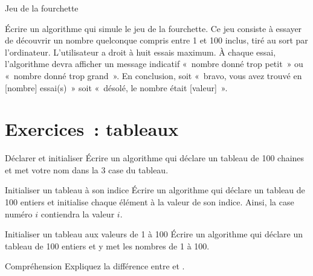 	\begin{Exercice}{Jeu de la fourchette}

		Écrire un algorithme qui simule le jeu de la
		fourchette. Ce jeu consiste à essayer de découvrir un nombre quelconque
		compris entre 1 et 100 inclus, tiré au sort par l’ordinateur. 
		L’utilisateur a droit à huit essais
		maximum. À chaque essai, l’algorithme devra afficher un message
		indicatif «~nombre donné trop petit~» ou «~nombre donné trop grand~».
		En conclusion, soit «~bravo, vous avez trouvé en [nombre] essai(s)~» soit
		«~désolé, le nombre était [valeur]~».
	\end{Exercice}







\section{Exercices~: tableaux}


	\begin{Exercice}{Déclarer et initialiser}
		Écrire un algorithme qui déclare un tableau de 100 chaines
		et met votre nom dans la 3\ieme{} case du tableau.
	\end{Exercice}

	\begin{Exercice}{Initialiser un tableau à son indice}
		Écrire un algorithme qui déclare un tableau de 100 entiers
		et initialise chaque élément à la valeur de son indice.
		Ainsi, la case numéro $i$ contiendra la valeur $i$.
	\end{Exercice}

	\begin{Exercice}{Initialiser un tableau aux valeurs de 1 à 100}
		Écrire un algorithme qui déclare un tableau de 100 entiers
		et y met les nombres de 1 à 100.
	\end{Exercice}

	\begin{Exercice}{Compréhension}
		Expliquez la différence entre 
		et .
	\end{Exercice}



